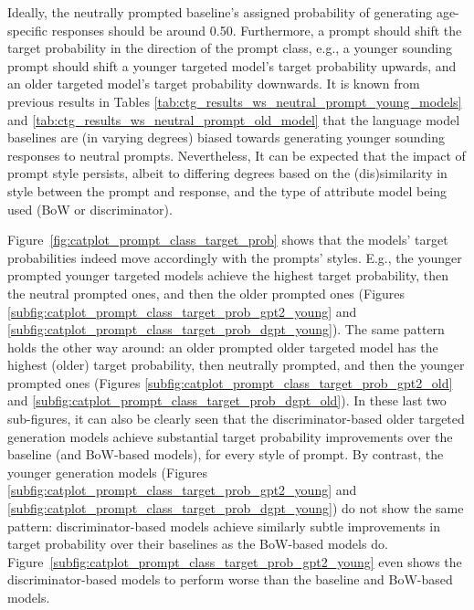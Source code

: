 Ideally, the neutrally prompted baseline's assigned probability of generating age-specific responses should be around 0.50. Furthermore, a prompt should shift the target probability in the direction of the prompt class, e.g., a younger sounding prompt should shift a younger targeted model's target probability upwards, and an older targeted model's target probability downwards. It is known from previous results in Tables \ref{tab:ctg_results_ws_neutral_prompt_young_models} and \ref{tab:ctg_results_ws_neutral_prompt_old_model} that the language model baselines are (in varying degrees) biased towards generating younger sounding responses to neutral prompts. Nevertheless, It can be expected that the impact of prompt style persists, albeit to differing degrees based on the (dis)similarity in style between the prompt and response, and the type of attribute model being used (BoW or discriminator).


Figure~\ref{fig:catplot_prompt_class_target_prob}
shows that the models' target probabilities indeed move accordingly with the prompts' styles. E.g., the younger prompted younger targeted models achieve the highest target probability, then the neutral prompted ones, and then the older prompted ones (Figures \ref{subfig:catplot_prompt_class_target_prob_gpt2_young} and \ref{subfig:catplot_prompt_class_target_prob_dgpt_young}). The same pattern holds the other way around: an older prompted older targeted model has the highest (older) target probability, then neutrally prompted, and then the younger prompted ones (Figures \ref{subfig:catplot_prompt_class_target_prob_gpt2_old} and \ref{subfig:catplot_prompt_class_target_prob_dgpt_old}). In these last two sub-figures, it can also be clearly seen that the discriminator-based older targeted generation models achieve substantial target probability improvements over the baseline (and BoW-based models), for every style of prompt. By contrast, the younger generation models (Figures \ref{subfig:catplot_prompt_class_target_prob_gpt2_young} and \ref{subfig:catplot_prompt_class_target_prob_dgpt_young}) do not show the same pattern: discriminator-based models achieve similarly subtle improvements in target probability over their baselines as the BoW-based models do. Figure~\ref{subfig:catplot_prompt_class_target_prob_gpt2_young} even shows the discriminator-based models to perform worse than the baseline and BoW-based models.


